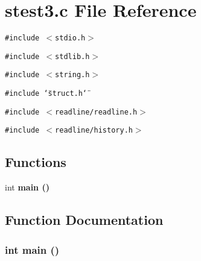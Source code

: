 \section{stest3.c File Reference}
\label{stest3_8c}
{\tt \#include $<$stdio.h$>$}\par
{\tt \#include $<$stdlib.h$>$}\par
{\tt \#include $<$string.h$>$}\par
{\tt \#include \char`\"{}struct.h\char`\"{}}\par
{\tt \#include $<$readline/readline.h$>$}\par
{\tt \#include $<$readline/history.h$>$}\par
\subsection*{Functions}
\begin{CompactItemize}
\item 
int \bf{main} ()
\end{CompactItemize}


\subsection{Function Documentation}
\subsubsection{\setlength{\rightskip}{0pt plus 5cm}int main ()}\label{stest3_8c_e66f6b31b5ad750f1fe042a706a4e3d4}


